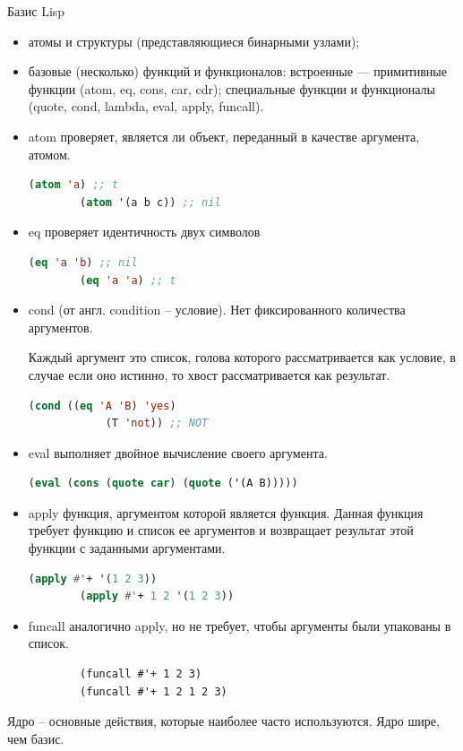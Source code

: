 Базис Lisp 
\begin{itemize}
	\item атомы и структуры (представляющиеся бинарными узлами);
	\item базовые (несколько) функций и функционалов: встроенные — примитивные
	функции (atom, eq, cons, car, cdr); специальные функции и функционалы (quote,
	cond, lambda, eval, apply, funcall).
\end{itemize}

\begin{itemize}
	\item atom проверяет, является ли объект, переданный в качестве аргумента, атомом.
	
		\begin{lstlisting}[language=Lisp]
		(atom 'a) ;; t
		(atom '(a b c)) ;; nil
		\end{lstlisting}
	
	\item eq проверяет идентичность двух символов
	
		\begin{lstlisting}[language=Lisp]
		(eq 'a 'b) ;; nil
		(eq 'a 'a) ;; t
		\end{lstlisting}
	
	\item cond (от англ. condition -- условие). Нет фиксированного количества аргументов. 
	
		Каждый аргумент это список, голова которого рассматривается как условие, в случае если оно истинно, то хвост рассматривается как результат.
		
		\begin{lstlisting}[language=Lisp]
		(cond ((eq 'A 'B) 'yes)
			(T 'not)) ;; NOT
		\end{lstlisting}
	
	\item eval выполняет двойное вычисление своего аргумента.
	
		\begin{lstlisting}[language=Lisp]
		(eval (cons (quote car) (quote ('(A B))))) 
		\end{lstlisting}
	
	
	\item apply функция, аргументом которой является функция. Данная функция требует функцию и список ее аргументов и возвращает результат этой функции с заданными аргументами. 
	
		\begin{lstlisting}[language=Lisp]
		(apply #'+ '(1 2 3))
		(apply #'+ 1 2 '(1 2 3))
		\end{lstlisting}
	
	
	\item funcall аналогично apply, но не требует, чтобы аргументы были упакованы в список.
	
	
		\begin{lstlisting}
		(funcall #'+ 1 2 3)
		(funcall #'+ 1 2 1 2 3)
		\end{lstlisting}

\end{itemize}
Ядро -- основные действия, которые наиболее часто используются. Ядро шире, чем базис.

